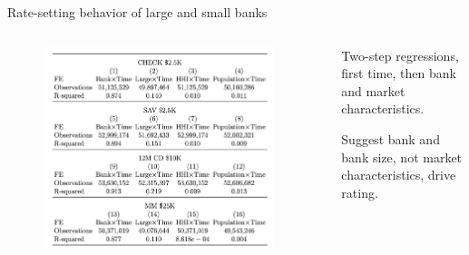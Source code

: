 \documentclass[notes,10pt, aspectratio=169]{beamer}
\newenvironment{wideitemize}{\itemize\addtolength{\itemsep}{10pt}}{\enditemize}
\begin{document}
\begin{frame}{Rate-setting behavior of large and small banks}

    \begin{columns}[T]
        
        \begin{column}{0.5\textwidth}
        
            \begin{figure}
                \centering
                \includegraphics[width=0.95\textwidth]{imgs/tab2.png}
            \end{figure}

    \end{column}
    \begin{column}{0.5\textwidth}
        
        \begin{wideitemize}
            \item Two-step regressions, first time, then bank and market characteristics.
            \item Suggest bank and bank size, not market characteristics, drive rating.
        \end{wideitemize}
    \end{column}
    \end{columns}
    
\end{frame}
\end{document}
